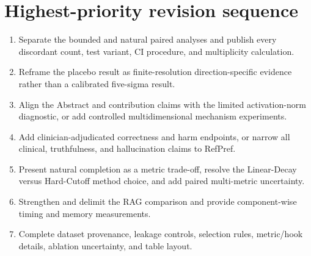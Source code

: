 \documentclass[11pt]{article}
\begin{document}
\section*{Highest-priority revision sequence}

\begin{enumerate}
    \item Separate the bounded and natural paired analyses and publish every discordant count, test variant, CI procedure, and multiplicity calculation.
    \item Reframe the placebo result as finite-resolution direction-specific evidence rather than a calibrated five-sigma result.
    \item Align the Abstract and contribution claims with the limited activation-norm diagnostic, or add controlled multidimensional mechanism experiments.
    \item Add clinician-adjudicated correctness and harm endpoints, or narrow all clinical, truthfulness, and hallucination claims to RefPref.
    \item Present natural completion as a metric trade-off, resolve the Linear-Decay versus Hard-Cutoff method choice, and add paired multi-metric uncertainty.
    \item Strengthen and delimit the RAG comparison and provide component-wise timing and memory measurements.
    \item Complete dataset provenance, leakage controls, selection rules, metric/hook details, ablation uncertainty, and table layout.
\end{enumerate}
\end{document}
